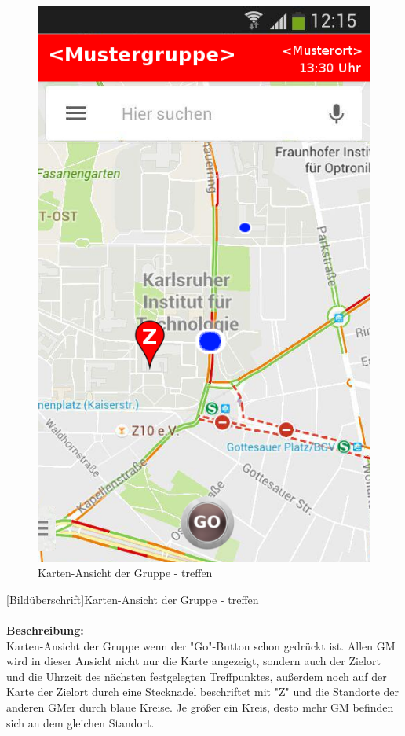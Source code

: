 \begin{figure}
	\caption{Karten-Ansicht der Gruppe - treffen}
	\includegraphics[scale =0.5]{resources/images/map_Go.png}
\end{figure}
[Bildüberschrift]Karten-Ansicht der Gruppe - treffen\\ \\
\textbf{Beschreibung:}\\
Karten-Ansicht der Gruppe wenn der "Go"-Button schon gedrückt ist. Allen GM wird in dieser Ansicht nicht nur die Karte angezeigt, sondern auch der Zielort und die Uhrzeit des nächsten festgelegten Treffpunktes, außerdem noch auf der Karte der Zielort durch eine Stecknadel beschriftet mit "Z" und die Standorte der anderen GMer durch blaue Kreise. Je größer ein Kreis, desto mehr GM befinden sich an dem gleichen Standort.\\
